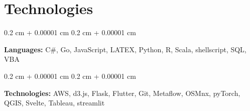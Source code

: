 \documentclass[10pt, a4paper]{article}
\newenvironment{onecolentry}{
    \begin{adjustwidth}{
        0.2 cm + 0.00001 cm
    }{
        0.2 cm + 0.00001 cm
    }
}{
    \end{adjustwidth}
} %
\begin{document}
    
    \section{Technologies}



        
        \begin{onecolentry}
            \textbf{Languages:} C\#, Go, JavaScript, LATEX, Python, R, Scala, shellscript, SQL, VBA
        \end{onecolentry}

        \vspace{0.2 cm}

        \begin{onecolentry}
            \textbf{Technologies:} AWS, d3.js, Flask, Flutter, Git, Metaflow, OSMnx, pyTorch, QGIS, Svelte, Tableau, streamlit
        \end{onecolentry}


    
\end{document}
